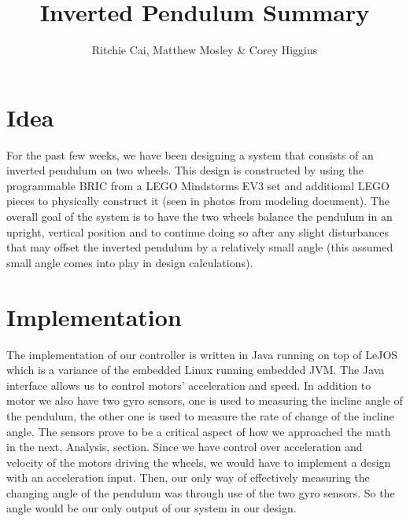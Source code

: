 \documentclass{notes}
\author{Ritchie Cai, Matthew Mosley \& Corey Higgins}
\title{Inverted Pendulum Summary}
\begin{document}
\maketitle 
\section{Idea}
For the past few weeks, we have been designing a system that consists of an inverted pendulum on two wheels. This design is constructed by using the programmable BRIC from a LEGO Mindstorms EV3 set and additional LEGO pieces to physically construct it (seen in photos from modeling document). The overall goal of the system is to have the two wheels balance the pendulum in an upright, vertical position and to continue doing so after any slight disturbances that may offset the inverted pendulum by a relatively small angle (this assumed small angle comes into play in design calculations). 

\section{Implementation}
The implementation of our controller is written in Java running on top of LeJOS which is a variance of the embedded Linux running embedded JVM. The Java interface allows us to control motors' acceleration and speed. In addition to motor we also have two gyro sensors, one is used to measuring the incline angle of the pendulum, the other one is used to measure the rate of change of the incline angle. The sensors prove to be a critical aspect of how we approached the math in the next, Analysis, section. Since we have control over acceleration and velocity of the motors driving the wheels, we would have to implement a design with an acceleration input. Then, our only way of effectively measuring the changing angle of the pendulum was through use of the two gyro sensors. So the angle would be our only output of our system in our design.
\end{document}
